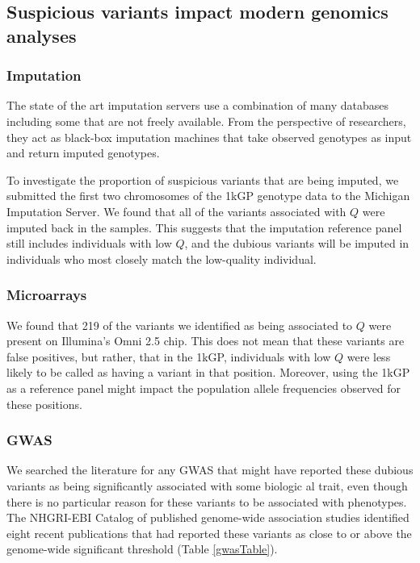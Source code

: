 \documentclass[9pt,lineno]{elife}
\begin{document}
\subsection{Suspicious variants impact modern genomics analyses}

\subsubsection{Imputation}

The state of the art imputation servers use a combination of many databases including some that are not freely available.
From the perspective of researchers, they act as black-box imputation machines that take observed genotypes as input and return imputed genotypes.  

To investigate the proportion of suspicious variants that are being imputed, we submitted the first two chromosomes of  the 1kGP genotype data to the Michigan Imputation Server.
We found that all of the variants associated with $Q$ were imputed back in the samples.
This suggests that the imputation reference panel still includes individuals with low $Q$, and the dubious variants will be imputed in individuals who most closely match the low-quality individual.

\subsubsection{Microarrays}

We found that 219 of the variants we identified as being associated to $Q$ were present on Illumina's Omni 2.5 chip. This does not mean that these variants are false positives, but rather, that in the 1kGP, individuals with low $Q$ were less likely to be called as having a variant in that position. Moreover, using the 1kGP as a reference panel might impact the population allele frequencies observed for these positions.

\subsubsection{GWAS}

We searched the literature for any GWAS that might have reported these dubious variants as being significantly associated with some biologic al trait, even though there is no particular reason for these variants to be associated with phenotypes.
The NHGRI-EBI Catalog of published genome-wide association studies identified eight recent publications that had reported these variants as close to or above the genome-wide significant threshold (Table \ref{gwasTable}).
\end{document}
